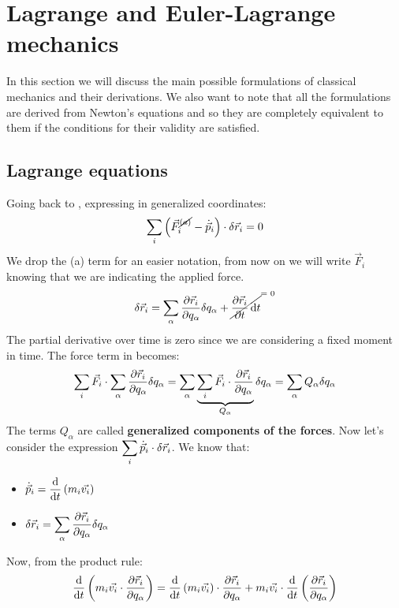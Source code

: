 \chapter{Lagrange and Euler-Lagrange mechanics}
In this section we will discuss the main possible formulations of classical mechanics and their derivations. We also want to note that all the formulations are derived from Newton's equations and so they are completely equivalent to them if the conditions for their validity are satisfied.
\section{Lagrange equations}
Going back to \dalambertref, expressing in generalized coordinates:
\begin{equation}
    \displaystyle\sum_i \left(\vec{F}^{\cancel{(a)}}_i - \dot{\vec{p}}_i\right) \cdot \delta \vec{r}_i = 0
\end{equation}
We drop the (a) term for an easier notation, from now on we will write $\vec{F}_i$ knowing that we are indicating the applied force.
\begin{equation}
    \delta \vec{r}_i = \bigsum_{\alpha} \dfrac{\partial \vec{r}_i}{\partial q_{\alpha}} \delta q_{\alpha} + \crossout{\dfrac{\partial \vec{r}_i}{\partial t} \dd{t}}
\end{equation}
The partial derivative over time is zero since we are considering a fixed moment in time. The force term in \dalambertref\;becomes:
\begin{equation}
    \displaystyle\sum_i \vec{F}_i \cdot \displaystyle\sum_{\alpha} \dfrac{\partial \vec{r}_i}{\partial q_{\alpha}} \delta q_{\alpha} = \displaystyle\sum_{\alpha}\underbrace{\displaystyle\sum_{i} \vec{F}_i \cdot \dfrac{\partial \vec{r}_i}{\partial q_{\alpha}}}_{Q_{\alpha}} \delta q_{\alpha} = \displaystyle\sum_{\alpha}Q_{\alpha}\delta q_{\alpha}
\end{equation}
The terms $Q_{\alpha}$ are called \textbf{generalized components of the forces}.
Now let's consider the expression $\displaystyle\sum_i \dot{\vec{p}}_i \cdot \delta \vec{r}_i$. We know that:
\begin{itemize}
    \item $\dvec{p}_i = \dv{}{t}\brackets{m_i\vec{v_i}}$
    \item $\delta \vec{r}_i = \displaystyle\sum_{\alpha} \dfrac{\partial \vec{r}_i}{\partial q_{\alpha}}\delta q_{\alpha}$
\end{itemize}
Now, from the product rule:
\begin{equation} \label{e:total_deriv}
    \dv{}{t}\brackets{m_i\vec{v_i} \cdot \dfrac{\partial \vec{r}_i}{\partial q_{\alpha}}} = \dv{}{t}\brackets{m_i\vec{v_i}}\cdot \dfrac{\partial \vec{r}_i}{\partial q_{\alpha}} + m_i\vec{v_i} \cdot \dv{}{t}\brackets{\dfrac{\partial \vec{r}_i}{\partial q_{\alpha}}}
\end{equation}
